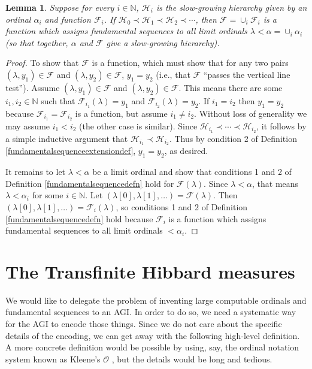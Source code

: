 \documentclass{article}
\newtheorem{lemma}[theorem]{Lemma}
\begin{document}
\begin{lemma}
\label{slowgrowingtechnicallemma}
    Suppose for every $i\in\mathbb N$,
    $\mathcal H_i$ is the slow-growing hierarchy given by an ordinal
    $\alpha_i$ and function $\mathcal F_i$.
    If $\mathcal H_0\prec \mathcal H_1\prec \mathcal H_2\prec\cdots$,
    then
    $\mathcal F=\cup_i\mathcal F_i$ is a function which assigns
    fundamental sequences
    to all limit ordinals $\lambda<\alpha=\cup_i\alpha_i$
    (so that together, $\alpha$ and $\mathcal F$
    give a slow-growing hierarchy).
\end{lemma}

\begin{proof}
    To show that $\mathcal F$ is a function, which must show that for any two pairs
    $(\lambda,y_1)\in\mathcal F$ and $(\lambda,y_2)\in\mathcal F$,
    $y_1=y_2$ (i.e., that
    $\mathcal F$ ``passes the vertical line test'').
    Assume $(\lambda,y_1)\in\mathcal F$ and $(\lambda,y_2)\in\mathcal F$.
    This means there are some $i_1,i_2\in\mathbb N$ such that
    $\mathcal F_{i_1}(\lambda)=y_1$ and $\mathcal F_{i_2}(\lambda)=y_2$.
    If $i_1=i_2$ then $y_1=y_2$ because $\mathcal F_{i_1}=\mathcal F_{i_2}$ is a function,
    but assume $i_1\neq i_2$. Without loss of generality we may
    assume $i_1<i_2$ (the other case is similar).
    Since $\mathcal H_{i_1}\prec \cdots \prec \mathcal H_{i_2}$,
    it follows by a simple inductive argument that $\mathcal H_{i_1}\prec \mathcal H_{i_2}$.
    Thus by condition 2 of Definition \ref{fundamentalsequenceextensiondef},
    $y_1=y_2$, as desired.

    It remains to let $\lambda<\alpha$ be a limit ordinal and show
    that conditions 1 and 2 of Definition \ref{fundamentalsequencedefn}
    hold for $\mathcal F(\lambda)$.
    Since $\lambda<\alpha$, that means $\lambda<\alpha_i$ for some $i\in\mathbb N$.
    Let $(\lambda[0],\lambda[1],\ldots)=\mathcal F(\lambda)$.
    Then $(\lambda[0],\lambda[1],\ldots)=\mathcal F_i(\lambda)$, so
    conditions 1 and 2 of Definition \ref{fundamentalsequencedefn} hold because
    $\mathcal F_i$ is a function which assigns fundamental sequences to all limit
    ordinals $<\alpha_i$.
\end{proof}

\section{The Transfinite Hibbard measures}
\label{transfinitehibbardsection}

We would like to delegate the problem of inventing large computable ordinals and
fundamental sequences to an AGI. In order to do so, we need a systematic
way for the AGI to encode those things. Since we do not care about the specific
details of the encoding, we can get away with the following high-level definition.
A more concrete definition would be possible by using, say, the ordinal notation
system known as Kleene's $\mathcal O$ \cite{kleene1938notation}, but the details
would be long and tedious.
\end{document}
